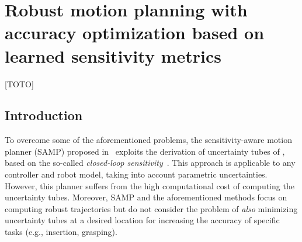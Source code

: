 \chapter{Robust motion planning with accuracy optimization based on learned sensitivity metrics}[TOTO]

\section{Introduction} \label{sec:introduction}

To overcome some of the aforementioned problems, the sensitivity-aware motion planner (SAMP) proposed in~\cite{cSAMP} exploits the derivation of uncertainty tubes of \cite{cTube}, based on the so-called \emph{closed-loop sensitivity}~\cite{cPi,cTh}.
This approach is applicable to any controller and robot model, taking into account parametric uncertainties. 
However, this planner suffers from the high computational cost of computing the uncertainty tubes.
Moreover, SAMP and the aforementioned methods focus on computing robust trajectories but do not consider the problem of \emph{also} minimizing uncertainty tubes at a desired location for increasing the accuracy of specific tasks (e.g., insertion, grasping).

